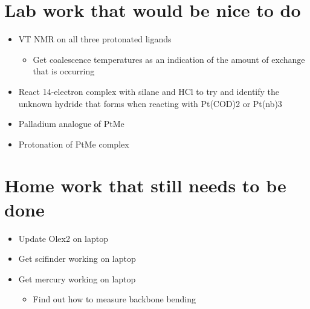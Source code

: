 \section{Lab work that would be nice to do}
\begin{itemize}
\item{VT NMR on all three protonated ligands}
	\begin{itemize}
	\item{Get coalescence temperatures as an indication of the amount of exchange that is occurring}
	\end{itemize}
\item{React 14-electron complex with silane and HCl to try and identify the unknown hydride that forms when reacting with Pt(COD)2 or Pt(nb)3}
\item{Palladium analogue of PtMe}
\item{Protonation of PtMe complex}
\end{itemize}

\newpage{}
\section{Home work that still needs to be done}
\begin{itemize}
\item{Update Olex2 on laptop}
\item{Get scifinder working on laptop}
\item{Get mercury working on laptop}
	\begin{itemize}
	\item{Find out how to measure backbone bending}
	\end{itemize}
\end{itemize}

